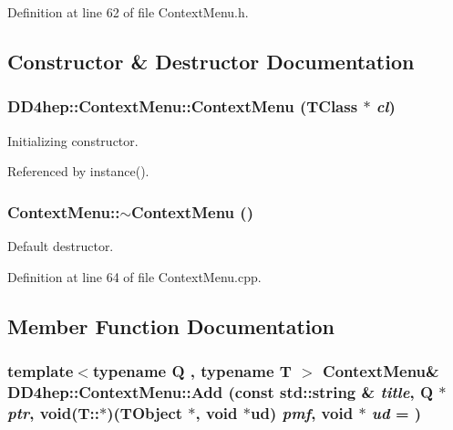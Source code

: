 Definition at line 62 of file ContextMenu.h.

\subsection{Constructor \& Destructor Documentation}
\hypertarget{class_d_d4hep_1_1_context_menu_aef60e3701d390f8a172be3de9c5a59ba}{
\subsubsection[{ContextMenu}]{\setlength{\rightskip}{0pt plus 5cm}DD4hep::ContextMenu::ContextMenu (TClass $\ast$ {\em cl})}}
\label{class_d_d4hep_1_1_context_menu_aef60e3701d390f8a172be3de9c5a59ba}


Initializing constructor. 

Referenced by instance().\hypertarget{class_d_d4hep_1_1_context_menu_a0ddd00b5e23fb9d89ad3cabae38aecf9}{
\subsubsection[{$\sim$ContextMenu}]{\setlength{\rightskip}{0pt plus 5cm}ContextMenu::$\sim$ContextMenu ()}}
\label{class_d_d4hep_1_1_context_menu_a0ddd00b5e23fb9d89ad3cabae38aecf9}


Default destructor. 

Definition at line 64 of file ContextMenu.cpp.

\subsection{Member Function Documentation}
\hypertarget{class_d_d4hep_1_1_context_menu_a7f3cd5ff904b8af781d686ff7de8219d}{
\subsubsection[{Add}]{\setlength{\rightskip}{0pt plus 5cm}template$<$typename Q , typename T $>$ {\bf ContextMenu}\& DD4hep::ContextMenu::Add (const std::string \& {\em title}, \/  Q $\ast$ {\em ptr}, \/  void(T::$\ast$)({\bf TObject} $\ast$, void $\ast$ud) {\em pmf}, \/  void $\ast$ {\em ud} = {})}}
\label{class_d_d4hep_1_1_context_menu_a7f3cd5ff904b8af781d686ff7de8219d}


